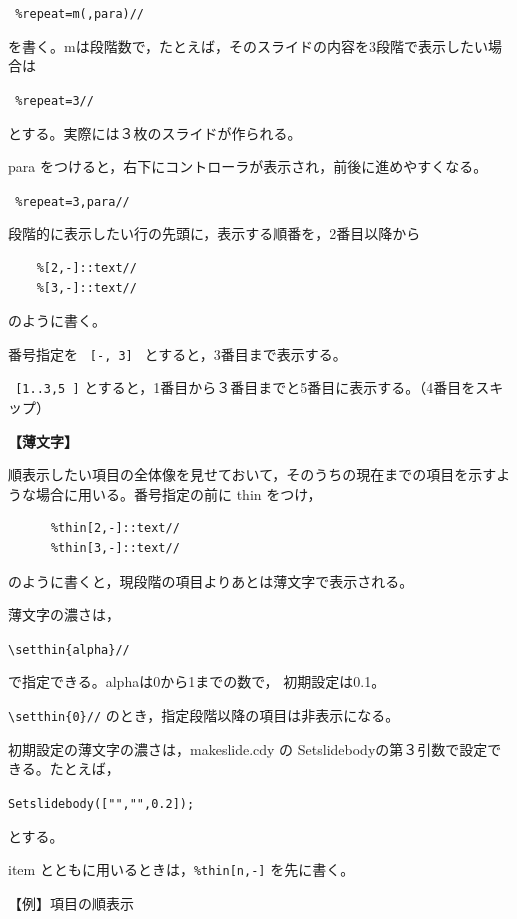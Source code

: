 \documentclass[papersize,a4paper,12pt,uplatex]{jsarticle}
\begin{document}
\hspace{10mm}\verb| %repeat=m(,para)//|

を書く。mは段階数で，たとえば，そのスライドの内容を3段階で表示したい場合は

\hspace{10mm}\verb| %repeat=3//|

とする。実際には３枚のスライドが作られる。

para をつけると，右下にコントローラが表示され，前後に進めやすくなる。

\hspace{10mm}\verb| %repeat=3,para//|

段階的に表示したい行の先頭に，表示する順番を，2番目以降から
\begin{verbatim}
    %[2,-]::text//
    %[3,-]::text//
\end{verbatim}

のように書く。
 
番号指定を \verb| [-, 3] | とすると，3番目まで表示する。

\verb| [1..3,5 ]| とすると，1番目から３番目までと5番目に表示する。（4番目をスキップ）

\vspace{\baselineskip}
 {\bf 【薄文字】}
 
 順表示したい項目の全体像を見せておいて，そのうちの現在までの項目を示すような場合に用いる。番号指定の前に thin をつけ，
 
 \begin{verbatim}
      %thin[2,-]::text//
      %thin[3,-]::text//
\end{verbatim}

のように書くと，現段階の項目よりあとは薄文字で表示される。
 
薄文字の濃さは，

\hspace{10mm} \verb|\setthin{alpha}//|

で指定できる。alphaは0から1までの数で， 初期設定は0.1。

\verb|\setthin{0}//| のとき，指定段階以降の項目は非表示になる。

 初期設定の薄文字の濃さは，makeslide.cdy の Setslidebodyの第３引数で設定できる。たとえば，

\hspace{10mm}\verb|Setslidebody(["","",0.2]);|

とする。

item とともに用いるときは，\verb|%thin[n,-]| を先に書く。

\vspace{\baselineskip}
【例】項目の順表示
\end{document}

